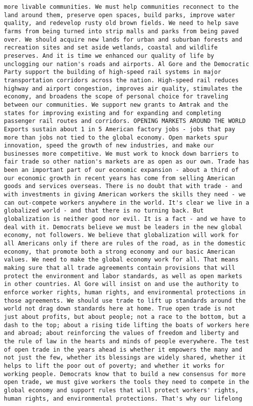 \documentclass[
]{article}
\begin{document}
\begin{verbatim}
more livable communities. We must help communities reconnect to the land around them, preserve open spaces, build parks, improve water quality, and redevelop rusty old brown fields. We need to help save farms from being turned into strip malls and parks from being paved over. We should acquire new lands for urban and suburban forests and recreation sites and set aside wetlands, coastal and wildlife preserves. And it is time we enhanced our quality of life by unclogging our nation's roads and airports. Al Gore and the Democratic Party support the building of high-speed rail systems in major transportation corridors across the nation. High-speed rail reduces highway and airport congestion, improves air quality, stimulates the economy, and broadens the scope of personal choice for traveling between our communities. We support new grants to Amtrak and the states for improving existing and for expanding and completing passenger rail routes and corridors. OPENING MARKETS AROUND THE WORLD Exports sustain about 1 in 5 American factory jobs - jobs that pay more than jobs not tied to the global economy. Open markets spur innovation, speed the growth of new industries, and make our businesses more competitive. We must work to knock down barriers to fair trade so other nation's markets are as open as our own. Trade has been an important part of our economic expansion - about a third of our economic growth in recent years has come from selling American goods and services overseas. There is no doubt that with trade - and with investments in giving American workers the skills they need - we can out-compete workers anywhere in the world. It's clear we live in a globalized world - and that there is no turning back. But globalization is neither good nor evil. It is a fact - and we have to deal with it. Democrats believe we must be leaders in the new global economy, not followers. We believe that globalization will work for all Americans only if there are rules of the road, as in the domestic economy, that promote both a strong economy and our basic American values. We need to make the global economy work for all. That means making sure that all trade agreements contain provisions that will protect the environment and labor standards, as well as open markets in other countries. Al Gore will insist on and use the authority to enforce worker rights, human rights, and environmental protections in those agreements. We should use trade to lift up standards around the world not drag down standards here at home. True open trade is not just about profits, but about people; not a race to the bottom, but a dash to the top; about a rising tide lifting the boats of workers here and abroad; about reinforcing the values of freedom and liberty and the rule of law in the hearts and minds of people everywhere. The test of open trade in the years ahead is whether it empowers the many and not just the few, whether its blessings are widely shared, whether it helps to lift the poor out of poverty; and whether it works for working people. Democrats know that to build a new consensus for more open trade, we must give workers the tools they need to compete in the global economy and support rules that will protect workers' rights, human rights, and environmental protections. That's why our lifelong 
\end{verbatim}
\end{document}
